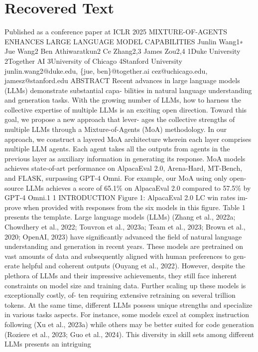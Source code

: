 \section{Recovered Text}
Published as a conference paper at ICLR 2025
MIXTURE-OF-AGENTS ENHANCES LARGE LANGUAGE
MODEL CAPABILITIES
Junlin Wang1∗
Jue Wang2
Ben Athiwaratkun2
Ce Zhang2,3
James Zou2,4
1Duke University
2Together AI
3University of Chicago
4Stanford University
junlin.wang2@duke.edu, \{jue, ben\}@together.ai
cez@uchicago.edu, jamesz@stanford.edu
ABSTRACT
Recent advances in large language models (LLMs) demonstrate substantial capa-
bilities in natural language understanding and generation tasks. With the growing
number of LLMs, how to harness the collective expertise of multiple LLMs is an
exciting open direction. Toward this goal, we propose a new approach that lever-
ages the collective strengths of multiple LLMs through a Mixture-of-Agents (MoA)
methodology. In our approach, we construct a layered MoA architecture wherein
each layer comprises multiple LLM agents. Each agent takes all the outputs from
agents in the previous layer as auxiliary information in generating its response.
MoA models achieves state-of-art performance on AlpacaEval 2.0, Arena-Hard,
MT-Bench, and FLASK, surpassing GPT-4 Omni. For example, our MoA using
only open-source LLMs achieves a score of 65.1\% on AlpacaEval 2.0 compared to
57.5\% by GPT-4 Omni.1
1
INTRODUCTION
Figure 1: AlpacaEval 2.0 LC win rates im-
prove when provided with responses from the
six models in this figure. Table 1 presents the
template.
Large language models (LLMs) (Zhang et al., 2022a;
Chowdhery et al., 2022; Touvron et al., 2023a; Team
et al., 2023; Brown et al., 2020; OpenAI, 2023) have
significantly advanced the field of natural language
understanding and generation in recent years. These
models are pretrained on vast amounts of data and
subsequently aligned with human preferences to gen-
erate helpful and coherent outputs (Ouyang et al.,
2022). However, despite the plethora of LLMs and
their impressive achievements, they still face inherent
constraints on model size and training data. Further
scaling up these models is exceptionally costly, of-
ten requiring extensive retraining on several trillion
tokens.
At the same time, different LLMs possess unique
strengths and specialize in various tasks aspects. For
instance, some models excel at complex instruction
following (Xu et al., 2023a) while others may be better suited for code generation (Roziere et al.,
2023; Guo et al., 2024). This diversity in skill sets among different LLMs presents an intriguing
